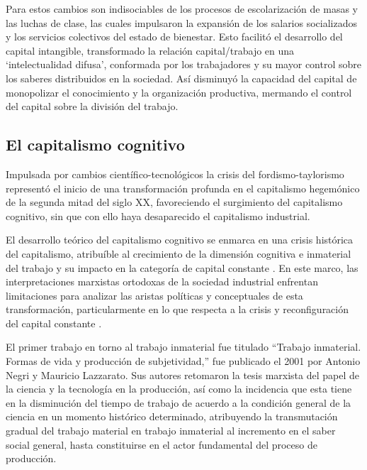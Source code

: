 \documentclass[
  spanish,
  11pt,
  a4paper,
]{scrbook}
\begin{document}
Para \textcite{Vercellone2011} estos cambios son indisociables de los
procesos de escolarización de masas y las luchas de clase, las cuales
impulsaron la expansión de los salarios socializados y los servicios
colectivos del estado de bienestar. Esto facilitó el desarrollo del
capital intangible, transformado la relación capital/trabajo en una
`intelectualidad difusa', conformada por los trabajadores y su mayor
control sobre los saberes distribuidos en la sociedad. Así disminuyó la
capacidad del capital de monopolizar el conocimiento y la organización
productiva, mermando el control del capital sobre la división del
trabajo.

\subsection*{El capitalismo cognitivo}\label{el-capitalismo-cognitivo}

Impulsada por cambios científico-tecnológicos la crisis del
fordismo-taylorismo representó el inicio de una transformación profunda
en el capitalismo hegemónico de la segunda mitad del siglo XX,
favoreciendo el surgimiento del capitalismo cognitivo, sin que con ello
haya desaparecido el capitalismo industrial.

El desarrollo teórico del capitalismo cognitivo se enmarca en una crisis
histórica del capitalismo, atribuíble al crecimiento de la dimensión
cognitiva e inmaterial del trabajo y su impacto en la categoría de
capital constante \autocite[65]{Vercellone2013}. En este marco, las
interpretaciones marxistas ortodoxas de la sociedad industrial enfrentan
limitaciones para analizar las aristas políticas y conceptuales de esta
transformación, particularmente en lo que respecta a la crisis y
reconfiguración del capital constante \autocite[24]{Caffentzis2016}.

El primer trabajo en torno al trabajo inmaterial fue titulado ``Trabajo
inmaterial. Formas de vida y producción de subjetividad,'' fue publicado
el 2001 por Antonio Negri y Mauricio Lazzarato. Sus autores retomaron la
tesis marxista del papel de la ciencia y la tecnología en la producción,
así como la incidencia que esta tiene en la disminución del tiempo de
trabajo de acuerdo a la condición general de la ciencia en un momento
histórico determinado, atribuyendo la transmutación gradual del trabajo
material en trabajo inmaterial al incremento en el saber social general,
hasta constituirse en el actor fundamental del proceso de producción.
\end{document}
